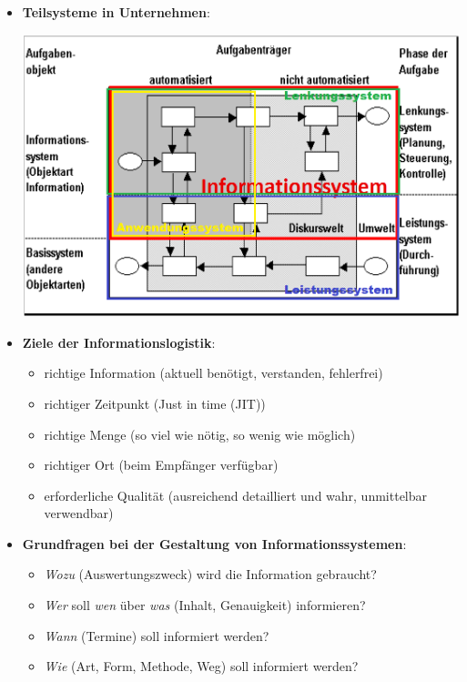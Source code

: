 \documentclass[12pt,a4paper]{article}
\begin{document}
\begin{itemize}
\newpage %
   \item \textbf{Teilsysteme in Unternehmen}:
         \begin{center}
            \includegraphics[scale=0.55]{Teilsysteme-in-Unternehmen.png}
         \end{center}
   
   \item \textbf{Ziele der Informationslogistik}:
         \begin{itemize}
            \item richtige Information (aktuell benötigt, verstanden, fehlerfrei)
            \item richtiger Zeitpunkt (Just in time (JIT))
            \item richtige Menge (so viel wie nötig, so wenig wie möglich)
            \item richtiger Ort (beim Empfänger verfügbar)
            \item erforderliche Qualität (ausreichend detailliert und wahr, unmittelbar verwendbar)
         \end{itemize}

   \item \textbf{Grundfragen bei der Gestaltung von Informationssystemen}:
      \begin{itemize}
         \item \textit{Wozu} (Auswertungszweck) wird die Information gebraucht?
         \item \textit{Wer} soll \textit{wen} über \textit{was} (Inhalt, Genauigkeit) informieren?
         \item \textit{Wann} (Termine) soll informiert werden?
         \item \textit{Wie} (Art, Form, Methode, Weg) soll informiert werden?
      \end{itemize}
\end{itemize}
\end{document}
